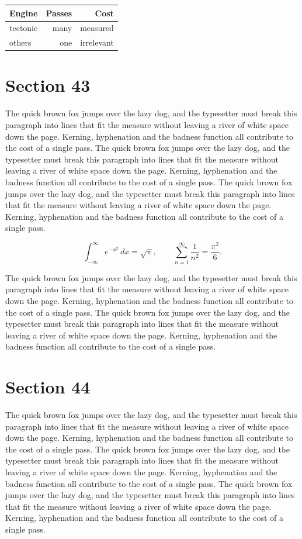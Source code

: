 \documentclass{article}
\begin{document}
\begin{center}
\begin{tabular}{lrr}
\toprule
Engine & Passes & Cost \\
\midrule
tectonic & many & measured \\
others & one & irrelevant \\
\bottomrule
\end{tabular}
\end{center}

\section{Section 43}
The quick brown fox jumps over the lazy dog, and the typesetter must break this paragraph into lines that fit the measure without leaving a river of white space down the page. Kerning, hyphenation and the badness function all contribute to the cost of a single pass. The quick brown fox jumps over the lazy dog, and the typesetter must break this paragraph into lines that fit the measure without leaving a river of white space down the page. Kerning, hyphenation and the badness function all contribute to the cost of a single pass. The quick brown fox jumps over the lazy dog, and the typesetter must break this paragraph into lines that fit the measure without leaving a river of white space down the page. Kerning, hyphenation and the badness function all contribute to the cost of a single pass. 

\begin{equation}
\int_{-\infty}^{\infty} e^{-x^{2}}\,dx = \sqrt{\pi}, \qquad
\sum_{n=1}^{\infty} \frac{1}{n^{2}} = \frac{\pi^{2}}{6}.
\end{equation}

The quick brown fox jumps over the lazy dog, and the typesetter must break this paragraph into lines that fit the measure without leaving a river of white space down the page. Kerning, hyphenation and the badness function all contribute to the cost of a single pass. The quick brown fox jumps over the lazy dog, and the typesetter must break this paragraph into lines that fit the measure without leaving a river of white space down the page. Kerning, hyphenation and the badness function all contribute to the cost of a single pass. 
\section{Section 44}
The quick brown fox jumps over the lazy dog, and the typesetter must break this paragraph into lines that fit the measure without leaving a river of white space down the page. Kerning, hyphenation and the badness function all contribute to the cost of a single pass. The quick brown fox jumps over the lazy dog, and the typesetter must break this paragraph into lines that fit the measure without leaving a river of white space down the page. Kerning, hyphenation and the badness function all contribute to the cost of a single pass. The quick brown fox jumps over the lazy dog, and the typesetter must break this paragraph into lines that fit the measure without leaving a river of white space down the page. Kerning, hyphenation and the badness function all contribute to the cost of a single pass. 
\end{document}
